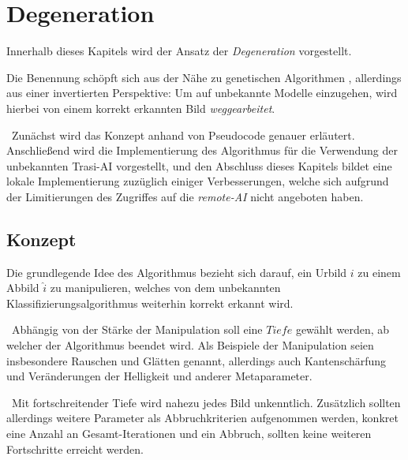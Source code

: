 \chapter{Degeneration}
\label{cha:Degeneration}
Innerhalb dieses Kapitels wird der Ansatz der \textit{Degeneration} vorgestellt.

Die Benennung schöpft sich aus der Nähe zu genetischen Algorithmen , allerdings aus einer invertierten Perspektive: Um auf unbekannte Modelle einzugehen, wird hierbei von einem korrekt erkannten Bild \textit{weggearbeitet}.

~\newline Zunächst wird das Konzept anhand von Pseudocode genauer erläutert. Anschließend wird die Implementierung des Algorithmus für die Verwendung der unbekannten Trasi-AI vorgestellt, und den Abschluss dieses Kapitels bildet eine lokale Implementierung zuzüglich einiger Verbesserungen, welche sich aufgrund der Limitierungen des Zugriffes auf die \textit{remote-AI} nicht angeboten haben.
\section{Konzept}
\label{sec:DegenerationKonzept}
Die grundlegende Idee des Algorithmus bezieht sich darauf, ein Urbild $i$ zu einem Abbild $\hat{i}$ zu manipulieren, welches von dem unbekannten Klassifizierungsalgorithmus weiterhin korrekt erkannt wird. 

~\newline Abhängig von der Stärke der Manipulation soll eine $Tiefe$ gewählt werden, ab welcher der Algorithmus beendet wird. Als Beispiele der Manipulation seien insbesondere Rauschen und Glätten genannt, allerdings auch Kantenschärfung und Veränderungen der Helligkeit und anderer Metaparameter. 

~\newline Mit fortschreitender Tiefe wird nahezu jedes Bild unkenntlich. Zusätzlich sollten allerdings weitere Parameter als Abbruchkriterien aufgenommen werden, konkret eine Anzahl an Gesamt-Iterationen und ein Abbruch, sollten keine weiteren Fortschritte erreicht werden.

\newpage
